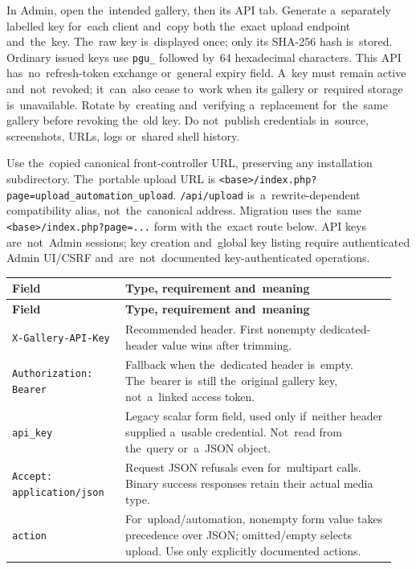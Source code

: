 \documentclass[11pt,a4paper]{article}
\newcommand{\codeword}[1]{\nolinkurl{#1}}
\begin{document}
In Admin, open the~intended gallery, then its API tab. Generate a~separately labelled key
for~each client and~copy both the~exact upload endpoint and~the~key. The~raw key
is~displayed once; only its SHA-256 hash is~stored. Ordinary issued keys use \codeword{pgu_}
followed by~64 hexadecimal characters. This API has~no~refresh-token exchange or~general
expiry field. A~key must remain active and~not~revoked; it~can~also cease to~work when its
gallery or~required storage is~unavailable. Rotate by~creating and~verifying a~replacement
for~the~same gallery before revoking the~old key. Do not~publish credentials in~source,
screenshots, URLs, logs or~shared shell history.

Use the~copied canonical front-controller URL, preserving any installation subdirectory.
The~portable upload URL is \codeword{<base>/index.php?page=upload_automation_upload}.
\codeword{/api/upload} is~a~rewrite-dependent compatibility alias, not~the~canonical
address. Migration uses the~same \codeword{<base>/index.php?page=...} form with the~exact
route below. API keys are~not~Admin sessions; key creation and~global key listing require
authenticated Admin UI/CSRF and~are~not~documented key-authenticated operations.

\begin{longtable}{@{}>{\RaggedRight\arraybackslash}p{0.28\linewidth}>{\RaggedRight\arraybackslash}p{0.67\linewidth}@{}}
\toprule
\textbf{Field} & \textbf{Type, requirement and~meaning} \\
\midrule
\endfirsthead
\toprule
\textbf{Field} & \textbf{Type, requirement and~meaning} \\
\midrule
\endhead
\bottomrule
\endfoot
\codeword{X-Gallery-API-Key} & Recommended header. First nonempty dedicated-header value
wins after trimming. \\
\codeword{Authorization: Bearer} & Fallback when the~dedicated header is~empty. The~bearer
is~still the~original gallery key, not~a~linked access token. \\
\codeword{api_key} & Legacy scalar form field, used only if~neither header supplied a~usable
credential. Not~read from the~query or~a~JSON object. \\
\codeword{Accept: application/json} & Request JSON refusals even for~multipart calls. Binary
success responses retain their actual media type. \\
\codeword{action} & For~upload/automation, nonempty form value takes precedence over JSON;
omitted/empty selects upload. Use only explicitly documented actions. \\
\end{longtable}
\end{document}
